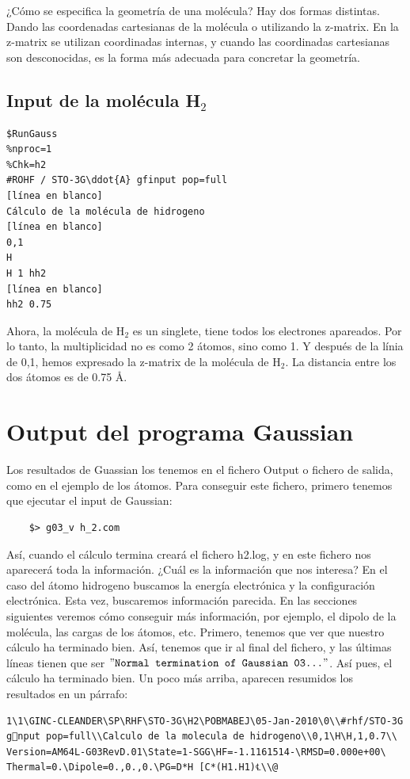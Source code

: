 \documentclass{tufte-book}
\begin{document}
¿Cómo se especifica la geometría de una molécula? Hay dos formas distintas. Dando las coordenadas cartesianas de la molécula o utilizando la z-matrix. En la z-matrix se utilizan coordinadas internas, y cuando las coordinadas cartesianas son desconocidas, es la forma más adecuada para concretar la geometría.

\subsection{Input de la molécula H$_2$}
\begin{verbatim}
$RunGauss
%nproc=1
%Chk=h2
#ROHF / STO-3G\ddot{A} gfinput pop=full
[línea en blanco]
Cálculo de la molécula de hidrogeno 
[línea en blanco] 
0,1
H
H 1 hh2
[línea en blanco]
hh2 0.75
\end{verbatim}

Ahora, la molécula de H$_2$ es un singlete, tiene todos los electrones apareados. Por lo tanto, la multiplicidad no es como 2 átomos, sino como 1. Y después de la línia de 0,1, hemos expresado la z-matrix de la molécula de H$_2$. La distancia entre los dos átomos es de 0.75 \r{A}.

\section{Output del programa Gaussian}

Los resultados de Guassian los tenemos en el fichero Output o fichero de salida, como en el ejemplo de los átomos. Para conseguir este fichero, primero tenemos que ejecutar el input de Gaussian:

\begin{verbatim}
    $> g03_v h_2.com
\end{verbatim}

Así, cuando el cálculo termina creará el fichero h2.log, y en este fichero nos aparecerá toda la información. ¿Cuál es la información que nos interesa? En el caso del átomo hidrogeno buscamos la energía electrónica y la configuración electrónica. Esta vez, buscaremos información parecida. En las secciones siguientes veremos cómo conseguir más información, por ejemplo, el dipolo de la molécula, las cargas de los átomos, etc. Primero, tenemos que ver que nuestro cálculo ha terminado bien. Así, tenemos que ir al final del fichero, y las últimas líneas tienen que ser $"\texttt{Normal termination of Gaussian 03...}"$. Así pues, el cálculo ha terminado bien. Un poco más arriba, aparecen resumidos los resultados en un párrafo:
\begin{small}
\begin{verbatim}
1\1\GINC-CLEANDER\SP\RHF\STO-3G\H2\POBMABEJ\05-Jan-2010\0\\#rhf/STO-3G
gnput pop=full\\Calculo de la molecula de hidrogeno\\0,1\H\H,1,0.7\\
Version=AM64L-G03RevD.01\State=1-SGG\HF=-1.1161514-\RMSD=0.000e+00\
Thermal=0.\Dipole=0.,0.,0.\PG=D*H [C*(H1.H1)℄\\@
\end{verbatim}
\end{small}
\end{document}
